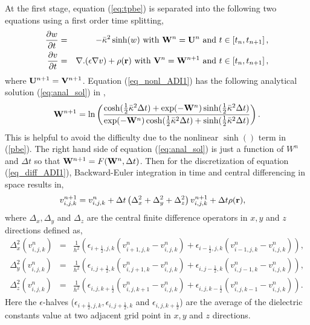At the first stage, equation (\ref{eq:tpbe}) is separated into the following two equations using a first order time splitting,
\begin{eqnarray}
  \frac{\partial w}{\partial t}&=& -\bar\kappa^2 \sinh(w) \text{ with } {\bf W}^n={\bf U}^n\text{ and } t \in \left[t_n,t_{n+1}\right],\label{eq_nonl_ADI1}\\
 \frac{\partial v}{\partial t}&=&  \nabla . (\epsilon\nabla v)+\rho({\bf r}) \text{ with } {\bf V}^n={\bf W}^{n+1}\text{ and } t \in \left[t_n,t_{n+1}\right],	 \label{eq_diff_ADI1}
\end{eqnarray}
where ${\bf U}^{n+1}={\bf V}^{n+1}$. Equation (\ref{eq_nonl_ADI1}) has the following analytical solution (\ref{eq:anal_sol}) in \cite{Geng2013_Fully},
	\begin{eqnarray}	
{\bf W}^{n+1}= \ln \left( \frac{\cosh(\frac{1}{2}\bar\kappa^2\Delta t)+\exp(-{\bf W}^n)\sinh(\frac{1}{2}\bar\kappa^2\Delta t)}{\exp(-{\bf W}^n)\cosh(\frac{1}{2}\bar\kappa^2\Delta t)+\sinh(\frac{1}{2}\bar\kappa^2\Delta t)}\right).\label{eq:anal_sol}
\end{eqnarray}
This is helpful to avoid the difficulty due to the nonlinear $\sinh()$ term in (\ref{pbe}). The right hand side of equation (\ref{eq:anal_sol}) is just a function of $W^n$ and $\Delta t$ so that ${\bf W}^{n+1}=F({\bf W}^n,\Delta t)$. Then for the discretization of equation (\ref{eq_diff_ADI1}), Backward-Euler integration in time and central differencing in space results in, 
\begin{eqnarray}
	v_{i,j,k}^{n+1} &=v_{i,j,k}^{n}+\Delta t \left(\Delta_x^2+\Delta_y^2+\Delta_z^2\right)v_{i,j,k}^{n+1}+\Delta t \rho({\bf r}), \label{eq:imp_ADI}
\end{eqnarray}
where $\Delta_x,\Delta_y$ and $\Delta_z$ are the central finite difference operators in $x,y$ and $z$ directions defined as, 
  \begin{eqnarray}
	\Delta_x^2\left(v_{i,j,k}^n\right)&=& \frac{1}{h^2} \left(\epsilon_{i+\frac{1}{2},j,k}(v_{i+1,j,k}^n-v_{i,j,k}^n)+\epsilon_{i-\frac{1}{2},j,k}(v_{i-1,j,k}^n-v_{i,j,k}^n)\right), \nonumber \\
	\Delta_y^2\left(v_{i,j,k}^n\right)&=& \frac{1}{h^2} \left(\epsilon_{i,j+\frac{1}{2},k}(v_{i,j+1,k}^n-v_{i,j,k}^n)+\epsilon_{i,j-\frac{1}{2},k}(v_{i,j-1,k}^n-v_{i,j,k}^n)\right),\\ \label{eq:dif_opx_adi1}
	\Delta_z^2\left(v_{i,j,k}^n\right)&=&\frac{1}{h^2} \left(\epsilon_{i,j,k+\frac{1}{2}}(v_{i,j,k+1}^n-v_{i,j,k}^n)+\epsilon_{i,j,k-\frac{1}{2}}(v_{i,j,k-1}^n-v_{i,j,k}^n)\right).  \nonumber
\end{eqnarray}
Here the $\epsilon$-halves ($\epsilon_{i+\frac{1}{2},j,k},\epsilon_{i,j+\frac{1}{2},k}$ and $\epsilon_{i,j,k+\frac{1}{2}}$) are the average of the dielectric constants value at two adjacent grid point in $x,y$ and $z$ directions. 

